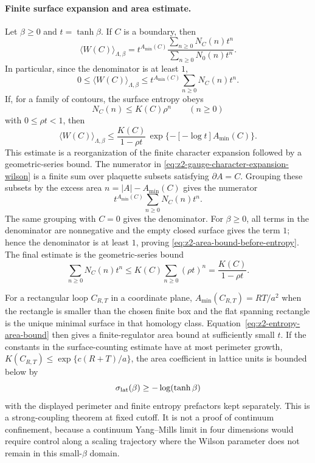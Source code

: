 \paragraph{Finite surface expansion and area estimate.}
Let \(\beta\geq0\) and \(t=\tanh\beta\).  If \(C\) is a boundary, then
\begin{equation}
  \langle W(C)\rangle_{\Lambda,\beta}
  =
  t^{A_{\min}(C)}
  \frac{\sum_{n\geq0}N_C(n)t^n}
       {\sum_{n\geq0}N_0(n)t^n}.
  \label{eq:z2-surface-counting-expansion}
\end{equation}
In particular, since the denominator is at least \(1\),
\begin{equation}
  0\leq
  \langle W(C)\rangle_{\Lambda,\beta}
  \leq
  t^{A_{\min}(C)}
  \sum_{n\geq0}N_C(n)t^n .
  \label{eq:z2-area-bound-before-entropy}
\end{equation}
If, for a family of contours, the surface entropy obeys
\begin{equation}
  N_C(n)\leq K(C)\rho^n
  \qquad(n\geq0)
  \label{eq:z2-surface-entropy-hypothesis}
\end{equation}
with \(0\leq\rho t<1\), then
\begin{equation}
  \langle W(C)\rangle_{\Lambda,\beta}
  \leq
  \frac{K(C)}{1-\rho t}\,
  \exp\{-[-\log t]A_{\min}(C)\}.
  \label{eq:z2-entropy-area-bound}
\end{equation}
This estimate is a reorganization of the finite character expansion followed
by a geometric-series bound.  The numerator in
\eqref{eq:z2-gauge-character-expansion-wilson} is a finite sum over
plaquette subsets satisfying \(\partial A=C\).  Grouping these subsets by the
excess area \(n=|A|-A_{\min}(C)\) gives the numerator
\[
  t^{A_{\min}(C)}\sum_{n\geq0}N_C(n)t^n .
\]
The same grouping with \(C=0\) gives the denominator.  For
\(\beta\geq0\), all terms in the denominator are nonnegative and the empty
closed surface gives the term \(1\); hence the denominator is at least
\(1\), proving \eqref{eq:z2-area-bound-before-entropy}.  The final estimate
is the geometric-series bound
\[
  \sum_{n\geq0}N_C(n)t^n
  \leq
  K(C)\sum_{n\geq0}(\rho t)^n
  =
  \frac{K(C)}{1-\rho t}.
\]

For a rectangular loop \(C_{R,T}\) in a coordinate plane,
\(A_{\min}(C_{R,T})=RT/a^2\) when the rectangle is smaller than the chosen
finite box and the flat spanning rectangle is the unique minimal surface in
that homology class.  Equation~\eqref{eq:z2-entropy-area-bound} then gives a
finite-regulator area bound at sufficiently small \(t\).  If the constants
in the surface-counting estimate have at most perimeter growth,
\(K(C_{R,T})\leq \exp\{c(R+T)/a\}\), the area coefficient in lattice units is
bounded below by
\[
  \sigma_{\rm lat}(\beta)\geq -\log(\tanh\beta)
\]
with the displayed perimeter and finite entropy prefactors kept separately.
This is a strong-coupling theorem at fixed cutoff.  It is not a proof of
continuum confinement, because a continuum Yang--Mills limit in four
dimensions would require control along a scaling trajectory where the Wilson
parameter does not remain in this small-\(\beta\) domain.

